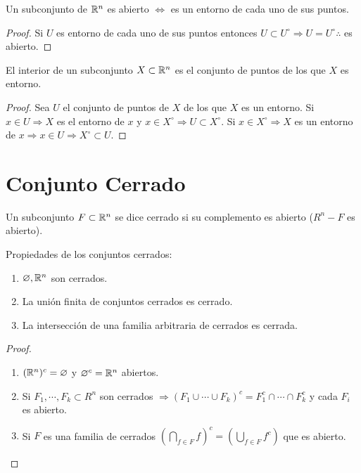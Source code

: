\begin{prop}
    Un subconjunto de $\mathbb{R}^n$ es abierto $\iff$ es un entorno de cada uno de sus puntos.
  \begin{proof}
      Si $U$ es entorno de cada uno de sus puntos entonces $U \subset U^{\circ} \Rightarrow U = U^{\circ} \therefore$ es abierto.
  \end{proof}
\end{prop}

\begin{prop}
  El interior de un subconjunto $X \subset \mathbb{R}^n$ es el conjunto de puntos de los que $X$ es entorno.
  \begin{proof}
    Sea $U$ el conjunto de puntos de $X$ de los que $X$ es un entorno. Si $x \in U \Rightarrow X$ es el entorno de $x$ y $x \in X^{\circ} \Rightarrow U \subset X^{\circ}$. Si $x \in X^{\circ} \Rightarrow X$ es un entorno de $x \Rightarrow x \in U \Rightarrow X^{\circ} \subset U$.
  \end{proof}
\end{prop}

\section{Conjunto Cerrado}

\begin{definition}
  Un subconjunto $F \subset \mathbb{R}^n$ se dice cerrado si su complemento es abierto ($R^n - F$ es abierto).
\end{definition}


\begin{prop}
  Propiedades de los conjuntos cerrados:
  \begin{enumerate}
    \item $\varnothing, \mathbb{R}^n$ son cerrados.
    \item La unión finita de conjuntos cerrados es cerrado.
    \item La intersección de una familia arbitraria de cerrados es cerrada.
  \end{enumerate}
  \begin{proof}
    \begin{enumerate}
      \item $(\mathbb{R}^n)^c = \varnothing$ y $\varnothing^c = \mathbb{R}^n$ abiertos.
      \item Si $F_1, \cdots, F_k \subset R^n$ son cerrados $\Rightarrow (F_1 \cup \cdots \cup F_k)^c = F_1^c \cap \cdots \cap F_k^c$ y cada $F_i$ es abierto.
      \item Si $F$ es una familia de cerrados $(\bigcap_{f \in F} f)^c = (\bigcup_{f \in F} f^c)$ que es abierto.
    \end{enumerate}
  \end{proof}
\end{prop}

